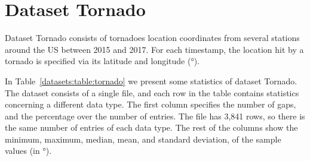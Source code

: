 
\vspace{-10pt}
\section{Dataset Tornado}
\label{datasets:tornado}


Dataset Tornado \cite{dataset:spc} consists of tornadoes location coordinates from several stations around the US between 2015 and 2017. For each timestamp, the location hit by a tornado is specified via its latitude and longitude (°). \SPCDef


In Table~\ref{datasets:table:tornado} we present some statistics of dataset Tornado. The dataset consists of a single file, and each row in the table contains statistics concerning a different data type. The first column specifies the number of gaps, and the percentage over the number of entries. The file has 3,841 rows, so there is the same number of entries of each data type. The rest of the columns show the minimum, maximum, median, mean, and standard deviation, of the sample values (in °).




